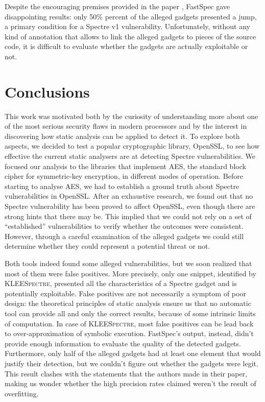 \documentclass[target=mst,aauheader=aics]{thud}
\theoremstyle{definition}
\begin{document}
    Despite the encouraging premises provided in the paper \cite{Tol2021}, FastSpec gave disappointing results: only 50\% percent of the alleged gadgets presented a jump, a primary condition for a Spectre v1 vulnerability. Unfortunately, without any kind of annotation that allows to link the alleged gadgets to pieces of the source code, it is difficult to evaluate whether the gadgets are actually exploitable or not.
	
	\chapter{Conclusions}\label{conclusions}
	
	This work was motivated both by the curiosity of understanding more about one of the most serious security flaws in modern processors and by the interest in discovering how static analysis can be applied to detect it. To explore both aspects, we decided to test a popular cryptographic library, OpenSSL, to see how effective the current static analysers are at detecting Spectre vulnerabilities. We focused our analysis to the libraries that implement AES, the standard block cipher for symmetric-key encryption, in different modes of operation. Before starting to analyse AES, we had to establish a ground truth about Spectre vulnerabilities in OpenSSL. After an exhaustive research, we found out that no Spectre vulnerability has been proved to affect OpenSSL, even though there are strong hints that there may be. This implied that we could not rely on a set of ``established'' vulnerabilities to verify whether the outcomes were consistent. However, through a careful examination of the alleged gadgets we could still determine whether they could represent a potential threat or not.
	
	Both tools indeed found some alleged vulnerabilities, but we soon realized that most of them were false positives. More precisely, only one snippet, identified by \textsc{KLEESpectre}, presented all the characteristics of a Spectre gadget and is potentially exploitable. False positives are not necessarily a symptom of poor design: the theoretical principles of static analysis ensure us that no automatic tool can provide all and only the correct results, because of some intrinsic limits of computation. In case of \textsc{KLEESpectre}, most false positives can be lead back to over-approximation of symbolic execution. FastSpec's output, instead, didn't provide enough information to evaluate the quality of the detected gadgets. Furthermore, only half of the alleged gadgets had at least one element that would justify their detection, but we couldn't figure out whether the gadgets were legit. This result clashes with the statements that the authors made in their paper, making us wonder whether the high precision rates claimed weren't the result of overfitting.
	
\end{document}
